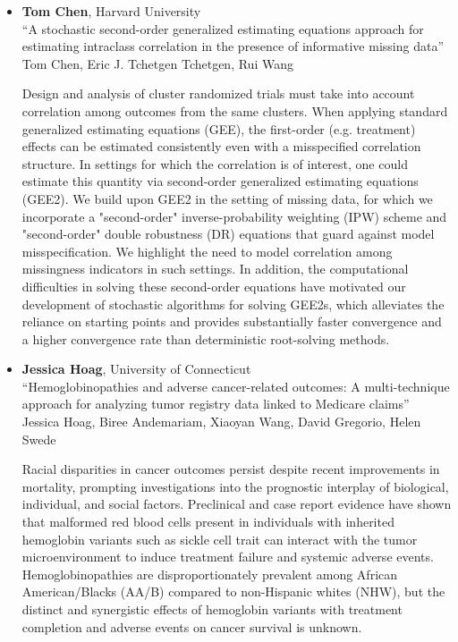 \begin{itemize}
\item \textbf{Tom Chen}, Harvard University \\
``A stochastic second-order generalized estimating equations approach for estimating intraclass correlation in the presence of informative missing data'' \\
Tom Chen, Eric J. Tchetgen Tchetgen, Rui Wang


Design and analysis of cluster randomized trials must take into account correlation among outcomes from the same clusters. When applying standard generalized estimating equations (GEE), the first-order (e.g. treatment) effects can be estimated consistently even with a misspecified correlation structure. In settings for which the correlation is of interest, one could estimate this quantity via second-order generalized estimating equations (GEE2). We build upon GEE2 in the setting of missing data, for which we incorporate a "second-order" inverse-probability weighting (IPW) scheme and "second-order" double robustness (DR) equations that guard against model misspecification. We highlight the need to model correlation among missingness indicators in such settings. In addition, the computational difficulties in solving these second-order equations have motivated our development of stochastic algorithms for solving GEE2s, which alleviates the reliance on starting points and provides substantially faster convergence and a higher convergence rate than deterministic root-solving methods.

\item \textbf{Jessica Hoag}, University of Connecticut \\
``Hemoglobinopathies and adverse cancer-related outcomes: A multi-technique approach for analyzing tumor registry data linked to Medicare claims'' \\
Jessica Hoag, Biree Andemariam, Xiaoyan Wang, David Gregorio, Helen Swede


Racial disparities in cancer outcomes persist despite recent improvements in mortality, prompting investigations into the prognostic interplay of biological, individual, and social factors. Preclinical and case report evidence have shown that malformed red blood cells present in individuals with inherited hemoglobin variants such as sickle cell trait can interact with the tumor microenvironment to induce treatment failure and systemic adverse events. Hemoglobinopathies are disproportionately prevalent among African American/Blacks (AA/B) compared to non-Hispanic whites (NHW), but the distinct and synergistic effects of hemoglobin variants with treatment completion and adverse events on cancer survival is unknown. 


\end{itemize}

